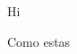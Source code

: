 \documentclass[11pt, spanish]{beamer}
\begin{document}
\begin{frame}
    Hi
\end{frame}

\begin{frame}
    Como estas
\end{frame}
\end{document}
